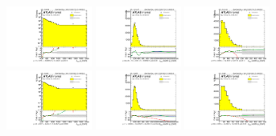 \begin{figure}[htbp!]
\begin{center}
\includegraphics[width=0.25\textwidth,angle=-90]{figures/boosted/Reweight/Fits/Moriond_NoTag_3Trk_subl_Incl_leadHCand_Pt_m_1.pdf}
\includegraphics[width=0.25\textwidth,angle=-90]{figures/boosted/Reweight/Fits/Moriond_NoTag_3Trk_subl_Incl_leadHCand_trk0_Pt.pdf}
\includegraphics[width=0.25\textwidth,angle=-90]{figures/boosted/Reweight/Fits/Moriond_NoTag_3Trk_subl_Incl_leadHCand_trk1_Pt.pdf} \\
\includegraphics[width=0.25\textwidth,angle=-90]{figures/boosted/Reweight/Fits/Moriond_bkg_0_NoTag_3Trk_subl_Incl_leadHCand_Pt_m_1.pdf}
\includegraphics[width=0.25\textwidth,angle=-90]{figures/boosted/Reweight/Fits/Moriond_bkg_0_NoTag_3Trk_subl_Incl_leadHCand_trk0_Pt.pdf}
\includegraphics[width=0.25\textwidth,angle=-90]{figures/boosted/Reweight/Fits/Moriond_bkg_0_NoTag_3Trk_subl_Incl_leadHCand_trk1_Pt.pdf} \\

\end{center}
\end{figure}
